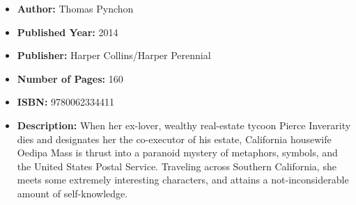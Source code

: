 \documentclass{tufte-handout}
\begin{document}
\begin{itemize}
    \item[] \textbf{Author:} Thomas Pynchon
    \item[] \textbf{Published Year:} 2014
    \item[] \textbf{Publisher:} Harper Collins/Harper Perennial
    \item[] \textbf{Number of Pages:} 160      
    \item[] \textbf{ISBN:} 9780062334411
    \item[] \textbf{Description:} When her ex-lover, wealthy real-estate tycoon Pierce Inverarity dies and designates her the co-executor of his estate, California housewife Oedipa Mass is thrust into a paranoid mystery of metaphors, symbols, and the United States Postal Service. Traveling across Southern California, she meets some extremely interesting characters, and attains a not-inconsiderable amount of self-knowledge.
\end{itemize}
\end{document}

